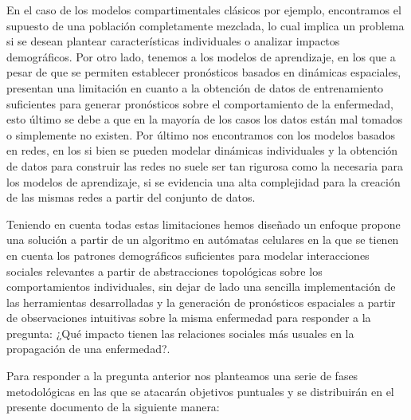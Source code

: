 En el caso de los modelos compartimentales clásicos por ejemplo, encontramos el supuesto de una población completamente mezclada, lo cual implica un problema si se desean plantear características individuales o analizar impactos demográficos. Por otro lado, tenemos a los modelos de aprendizaje, en los que a pesar de que se permiten establecer pronósticos basados en dinámicas espaciales, presentan una limitación en cuanto a la obtención de datos de entrenamiento suficientes para generar pronósticos sobre el comportamiento de la enfermedad, esto último se debe a que en la mayoría de los casos los datos están mal tomados o simplemente no existen. Por último nos encontramos con los modelos basados en redes, en los si bien se pueden modelar dinámicas individuales y la obtención de datos para construir las redes no suele ser tan rigurosa como la necesaria para los modelos de aprendizaje, si se evidencia una alta complejidad para la creación de las mismas redes a partir del conjunto de datos.

Teniendo en cuenta todas estas limitaciones hemos diseñado un enfoque  propone una solución a partir de un algoritmo en autómatas celulares en la que se tienen en cuenta los patrones demográficos suficientes para modelar interacciones sociales relevantes a partir de abstracciones topológicas sobre los comportamientos individuales, sin dejar de lado una sencilla implementación de las herramientas desarrolladas y la generación de pronósticos espaciales a partir de observaciones intuitivas sobre la misma enfermedad para responder a la pregunta: ¿Qué impacto tienen las relaciones sociales más usuales en la propagación de una enfermedad?.

Para responder a la pregunta anterior nos planteamos una serie de fases metodológicas en las que se atacarán objetivos puntuales y se distribuirán en el presente documento de la siguiente manera:

